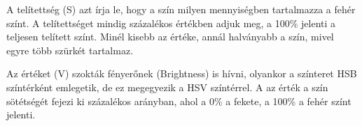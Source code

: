 A telítettség (S) azt írja le, hogy a szín milyen mennyiségben tartalmazza a fehér színt. A telítettséget mindig százalékos értékben adjuk meg, a 100\% jelenti a teljesen telített színt. Minél kisebb az értéke, annál halványabb a szín, mivel egyre több szürkét tartalmaz.

Az értéket (V) szokták fényerőnek (Brightness) is hívni, olyankor a színteret HSB színtérként emlegetik, de ez megegyezik a HSV színtérrel. A az érték a szín sötétségét fejezi ki százalékos arányban, ahol a 0\% a fekete, a 100\% a fehér színt jelenti. \cite{colorspaces}

